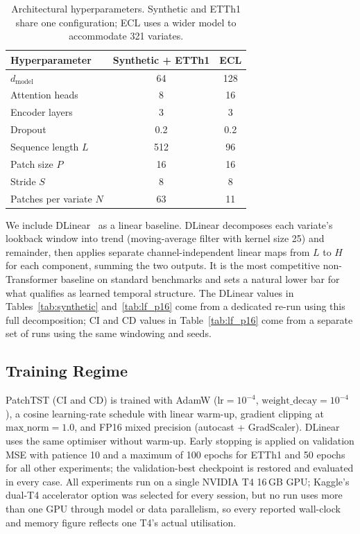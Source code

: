 \documentclass[10pt]{article} %
\begin{document}
    \begin{table}[htbp]
        \centering
        \caption{Architectural hyperparameters. Synthetic and ETTh1 share one configuration;
        ECL uses a wider model to accommodate 321 variates.}
        \label{tab:arch}
        \begin{tabular}{lcc}
            \toprule
            Hyperparameter          & Synthetic + ETTh1 & ECL \\
            \midrule
            $d_{\text{model}}$      & 64                & 128 \\
            Attention heads         & 8                 & 16  \\
            Encoder layers          & 3                 & 3   \\
            Dropout                 & 0.2               & 0.2 \\
            Sequence length $L$     & 512               & 96  \\
            Patch size $P$          & 16                & 16  \\
            Stride $S$              & 8                 & 8   \\
            Patches per variate $N$ & 63                & 11  \\
            \bottomrule
        \end{tabular}
    \end{table}

    We include DLinear~\citep{zeng2023transformerseffectivetimeseries} as a linear baseline. DLinear decomposes each
    variate's lookback window into trend (moving-average filter with kernel size 25) and remainder, then applies separate
    channel-independent linear maps from $L$ to $H$ for each component, summing the two outputs. It is the most competitive
    non-Transformer baseline on standard benchmarks and sets a natural lower bar for what qualifies as learned temporal
    structure. The DLinear values in Tables~\ref{tab:synthetic} and~\ref{tab:lf_p16} come from a dedicated
    re-run using this full decomposition; CI and CD values in Table~\ref{tab:lf_p16} come from a separate set of runs
    using the same windowing and seeds.

    \subsection{Training Regime}

    PatchTST (CI and CD) is trained with AdamW ($\text{lr} = 10^{-4}$, $\text{weight\_decay} = 10^{-4}$), a cosine
    learning-rate schedule with linear warm-up, gradient clipping at $\text{max\_norm} = 1.0$, and FP16 mixed precision
    (autocast + GradScaler). DLinear uses the same optimiser without warm-up. Early stopping is applied on validation MSE
    with patience 10 and a maximum of 100 epochs for ETTh1 and 50 epochs for all other experiments; the validation-best
    checkpoint is restored and evaluated in every case. All experiments run on a single NVIDIA T4 16\,GB GPU; Kaggle's
    dual-T4 accelerator option was selected for every session, but no run uses more than one GPU through model or data
    parallelism, so every reported wall-clock and memory figure reflects one T4's actual utilisation.
\end{document}

